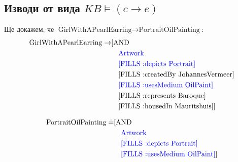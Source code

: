 \documentclass[a4paper, 11pt]{article}
\begin{document}
\subsection{Изводи от вида $KB \vDash (c \rightarrow e)$}
Ще докажем, че $\text{GirlWithAPearlEarring} \rightarrow \text{PortraitOilPainting}$:
\begin{align*}
  \text{GirlWithAPearlEarring} 
  \rightarrow & \text{[AND}\\
              & \quad \text{\textcolor{blue}{Artwork}} \\
              & \quad \text{\textcolor{blue}{[FILLS :depicts Portrait]}} \\
              & \quad \text{[FILLS :createdBy JohannesVermeer]} \\
              & \quad \text{\textcolor{blue}{[FILLS :usesMedium OilPaint]}} \\
              & \quad \text{[FILLS :represents Baroque]} \\
              & \quad \text{[FILLS :housedIn Mauritshuis]]} \\
\end{align*}


\begin{align*}
  \text{PortraitOilPainting}\doteq & \text{[AND}\\
  & \quad \text{\textcolor{blue}{Artwork}} \\
  & \quad \text{\textcolor{blue}{[FILLS :depicts Portrait]}} \\
  & \quad \text{\textcolor{blue}{[FILLS :usesMedium OilPaint]}]} \\
\end{align*}
\end{document}
